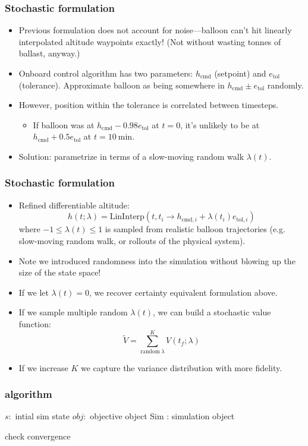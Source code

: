 \documentclass[10pt,mathserif]{beamer}
\begin{document}
\begin{frame}
\frametitle{Stochastic formulation}
\begin{itemize}
\item Previous formulation does not account for noise---balloon can't hit linearly interpolated altitude waypoints exactly! (Not without wasting tonnes of ballast, anyway.)
\item Onboard control algorithm has two parameters: $h_\text{cmd}$ (setpoint) and $e_\text{tol}$ (tolerance). Approximate balloon as being somewhere in $h_\text{cmd}\pm e_\text{tol}$ randomly.
\item However, position within the tolerance is correlated between timesteps.
\begin{itemize}
\item If balloon was at $h_\text{cmd} - 0.98e_\text{tol}$ at $t=0$, it's unlikely to be at $h_\text{cmd} + 0.5e_\text{tol}$ at $t=10~\text{min}$.
\end{itemize}
\item Solution: parametrize in terms of a slow-moving random walk $\lambda(t)$.
\end{itemize}
\end{frame}

\begin{frame}
\frametitle{Stochastic formulation}

\begin{itemize}
\item Refined differentiable altitude:
\[h(t; \lambda) =
\text{LinInterp}\left(t, t_i \to h_{\text{cmd},i} + \lambda(t_i) e_{\text{tol},i}\right)
\]
where $-1 \leq \lambda(t) \leq 1$ is sampled from realistic balloon trajectories (e.g. slow-moving random walk, or rollouts of the physical system).
\item Note we introduced randomness into the simulation without blowing up the size of the state space!
\item If we let $\lambda(t)=0$, we recover certainty equivalent formulation above.
\item If we sample multiple random $\lambda(t)$, we can build a stochastic value function:
\[\tilde V = \sum_{\text{random}~\lambda}^K V(t_f; \lambda)\]
\item If we increase $K$ we capture the variance distribution with more fidelity.
\end{itemize}

\end{frame}

\begin{frame}
\frametitle{algorithm}
\begin{algorithmic}[1]
\State$s:$ intial sim state
\State$obj:$ objective object
\State Sim : simulation object
\EndFor 

check convergence
\EndWhile
\EndProcedure
\end{algorithmic}
\end{frame}
\end{document}
